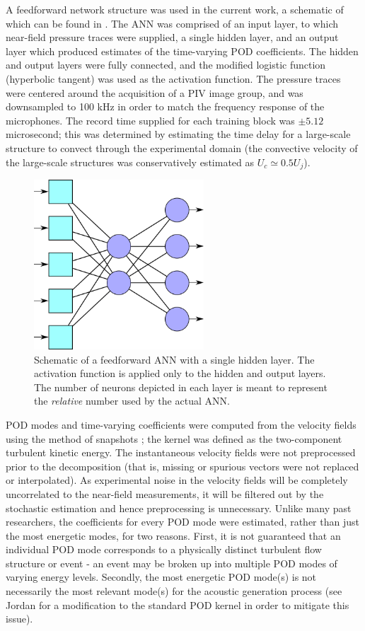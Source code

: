 A feedforward network structure was used in the current work, a schematic of which can be found in .
The ANN was comprised of an input layer, to which near-field pressure traces were supplied, a single hidden layer, and an output layer which produced estimates of the time-varying POD coefficients. 
The hidden and output layers were fully connected, and the modified logistic function (hyperbolic tangent) was used as the activation function.
The pressure traces were centered around the acquisition of a PIV image group, and was downsampled to 100 kHz in order to match the frequency response of the microphones.
The record time supplied for each training block was $\pm 5.12$ microsecond; this was determined by estimating the time delay for a large-scale structure to convect through the experimental domain (the convective velocity of the large-scale structures was conservatively estimated as $U_c \simeq 0.5 U_j$).
\begin{figure}
	\centering
	\includegraphics[width = 2.5in]{Figures/neural_net_v2.png}
	\caption{Schematic of a feedforward ANN with a single hidden layer. The activation function is applied only to the hidden and output layers. The number of neurons depicted in each layer is meant to represent the \textit{relative} number used by the actual ANN.}
	\label{fig:ch4_neural_net}
\end{figure} 

POD modes and time-varying coefficients were computed from the velocity fields using the method of snapshots \citep{Sirovich1987}; the kernel was defined as the two-component turbulent kinetic energy.
The instantaneous velocity fields were not preprocessed prior to the decomposition (that is, missing or spurious vectors were not replaced or interpolated).
As experimental noise in the velocity fields will be completely uncorrelated to the near-field measurements, it will be filtered out by the stochastic estimation and hence preprocessing is unnecessary.
Unlike many past researchers, the coefficients for every POD mode were estimated, rather than just the most energetic modes, for two reasons.
First, it is not guaranteed that an individual POD mode corresponds to a physically distinct turbulent flow structure or event - an event may be broken up into multiple POD modes of varying energy levels.
Secondly, the most energetic POD mode(s) is not necessarily the most relevant mode(s) for the acoustic generation process (see Jordan \etal \citep{Jordan2007} for a modification to the standard POD kernel in order to mitigate this issue). 


